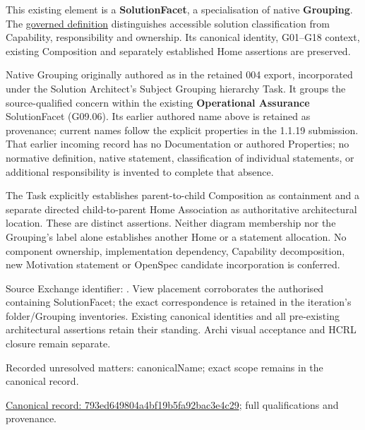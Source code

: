 This existing element is a \textbf{SolutionFacet}, a specialisation of native
\textbf{Grouping}. The \href{\detokenize{../../../../../../../governance/continuum-representation.md#solutionfacet-classification--1119-candidate}}{governed definition}
distinguishes accessible solution classification from Capability, responsibility
and ownership. Its canonical identity, G01–G18 context, existing Composition
and separately established Home assertions are preserved.



Native Grouping originally authored as \texttt{} in the retained 004 export,
incorporated under the Solution Architect's Subject Grouping hierarchy Task.
It groups the source-qualified \texttt{} concern within
the existing \textbf{Operational Assurance} SolutionFacet (G09.06). Its earlier authored name above is retained as provenance; current names
follow the explicit properties in the 1.1.19 submission.
That earlier incoming record has no Documentation or authored Properties; no normative
definition, native statement, classification of individual statements, or
additional responsibility is invented to complete that absence.



The Task explicitly establishes parent-to-child Composition as containment and
a separate directed child-to-parent Home Association as authoritative architectural
location. These are distinct assertions. Neither diagram membership nor the
Grouping's label alone establishes another Home or a statement allocation.
No component ownership, implementation dependency, Capability decomposition,
new Motivation statement or OpenSpec candidate incorporation is conferred.



Source Exchange identifier: \texttt{}. View placement corroborates
the authorised containing SolutionFacet; the exact correspondence is retained in the
iteration's folder/Grouping inventories. Existing canonical identities and all
pre-existing architectural assertions retain their standing. Archi visual
acceptance and HCRL closure remain separate.


{\small Recorded unresolved matters: canonicalName; exact scope remains in the canonical record.}\par
{\footnotesize \href{../../../../../../../continuum/grouping/793ed649804a4bf19b5fa92bac3e4c29.md}{Canonical record: 793ed649804a4bf19b5fa92bac3e4c29}; full qualifications and provenance.}\par
